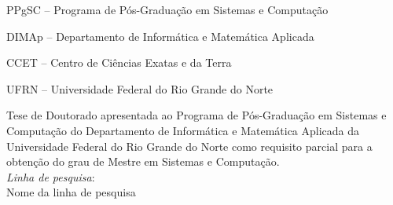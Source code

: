 
\instituicao
{
	PPgSC -- Programa de Pós-Graduação em Sistemas e Computação\par 
	DIMAp -- Departamento de Informática e Matemática Aplicada\par
   CCET -- Centro de Ciências Exatas e da Terra\par
   UFRN -- Universidade Federal do Rio Grande do Norte
}
	
\comentario
{
	Tese de Doutorado apresentada ao Programa de Pós-Graduação em Sistemas e Computação do Departamento de Informática e Matemática Aplicada da Universidade Federal do Rio Grande do Norte como requisito parcial para a obtenção do grau de Mestre em Sistemas e Computação.\bigskip\\
   \textit{Linha de pesquisa}:\\Nome da linha de pesquisa
}
		
	
\folhaderosto